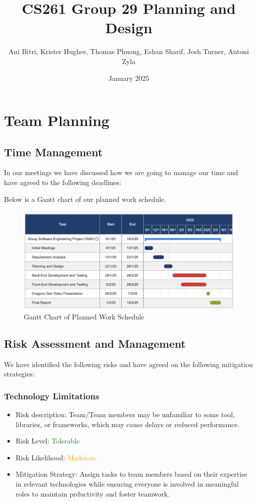 \documentclass{article}
\title{CS261 Group 29 Planning and Design}
\author{Ani Bitri, Krister Hughes, Thomas Phuong, Eshan Sharif, Josh Turner, Antoni Zyla}
\date{January 2025}
\begin{document}
\maketitle


\section{Team Planning}
\subsection{Time Management}
In our meetings we have discussed how we are going to manage our time and have agreed to the following deadlines:

Below is a Gantt chart of our planned work schedule.

\begin{figure}[H]
    \centering
    \includegraphics[width=\textwidth]{ganttchart.png}
    \caption{Gantt Chart of Planned Work Schedule}
    \label{fig:gantt_chart}
\end{figure}


\subsection{Risk Assessment and Management}
We have identified the following risks and have agreed on the following mitigation strategies:
\subsubsection{Technology Limitations}
\begin{itemize}
    \item Risk description: Team/Team members may be unfamiliar to some tool, libraries, or frameworks, which may cause delays or reduced performance. 
    \item Risk Level: \textcolor{green}{Tolerable}
    \item Risk Likelihood: \textcolor{orange}{Moderate}
    \item Mitigation Strategy: Assign tasks to team members based on their expertise in relevant technologies while ensuring everyone is involved in meaningful roles to maintain prductivity and foster teamwork.
\end{itemize}
\end{document}
